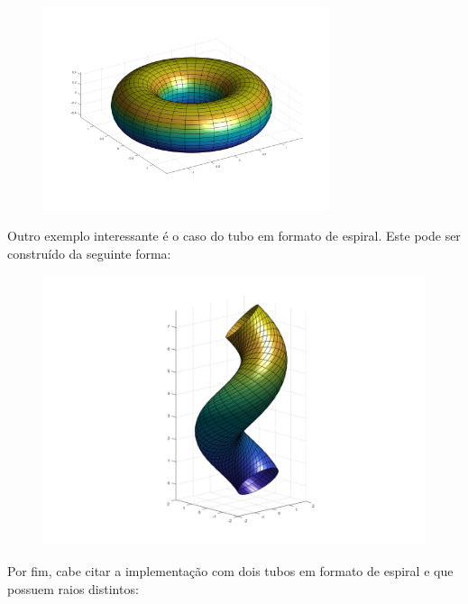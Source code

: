 \documentclass[a4paper]{article}
\begin{document}
\begin{figure}[h!]
  \caption{}
  \centering
  \includegraphics[width=0.75\textwidth]{toro.png}
\end{figure}

\newpage

Outro exemplo interessante é o caso do tubo em formato de espiral. Este pode ser construído da seguinte forma: 




\begin{figure}[h!]
  \caption{}
  \centering
  \includegraphics[width=1\textwidth]{espiral.png}
\end{figure}


\newpage

Por fim, cabe citar a implementação com dois tubos em formato de espiral e que possuem raios distintos:


\end{document}
